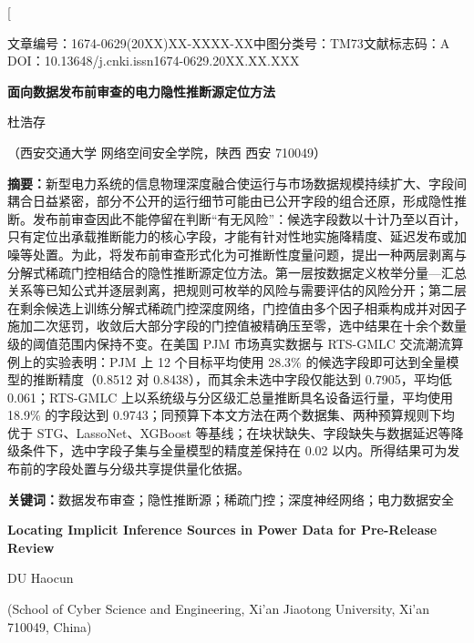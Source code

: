 \documentclass[UTF8,zihao=5,twoside]{ctexart}
\newcommand{\articleinfo}{文章编号：1674-0629(20XX)XX-XXXX-XX\quad 中图分类号：TM73\quad 文献标志码：A\\
DOI：10.13648/j.cnki.issn1674-0629.20XX.XX.XXX}
\begin{document}
\twocolumn[

\begin{center}
{\articleinfo}\par\vspace{1.0em}
{\sffamily{}\bfseries 面向数据发布前审查的电力隐性推断源定位方法}\par\vspace{0.8em}
{杜浩存}\par\vspace{0.4em}
{（西安交通大学 网络空间安全学院，陕西 西安 710049）}\par\vspace{0.8em}
\end{center}

\noindent\textbf{摘要：}新型电力系统的信息物理深度融合使运行与市场数据规模持续扩大、字段间耦合日益紧密，部分不公开的运行细节可能由已公开字段的组合还原，形成隐性推断。发布前审查因此不能停留在判断“有无风险”：候选字段数以十计乃至以百计，只有定位出承载推断能力的核心字段，才能有针对性地实施降精度、延迟发布或加噪等处置。为此，将发布前审查形式化为可推断性度量问题，提出一种两层剥离与分解式稀疏门控相结合的隐性推断源定位方法。第一层按数据定义枚举分量—汇总关系等已知公式并逐层剥离，把规则可枚举的风险与需要评估的风险分开；第二层在剩余候选上训练分解式稀疏门控深度网络，门控值由多个因子相乘构成并对因子施加二次惩罚，收敛后大部分字段的门控值被精确压至零，选中结果在十余个数量级的阈值范围内保持不变。在美国 PJM 市场真实数据与 RTS-GMLC 交流潮流算例上的实验表明：PJM 上 12 个目标平均使用 28.3\% 的候选字段即可达到全量模型的推断精度（0.8512 对 0.8438），而其余未选中字段仅能达到 0.7905，平均低 0.061；RTS-GMLC 上以系统级与分区级汇总量推断具名设备运行量，平均使用 18.9\% 的字段达到 0.9743；同预算下本文方法在两个数据集、两种预算规则下均优于 STG、LassoNet、XGBoost 等基线；在块状缺失、字段缺失与数据延迟等降级条件下，选中字段子集与全量模型的精度差保持在 0.02 以内。所得结果可为发布前的字段处置与分级共享提供量化依据。\par
\noindent\textbf{关键词：}数据发布审查；隐性推断源；稀疏门控；深度神经网络；电力数据安全\par\vspace{0.8em}

\begin{center}
{\bfseries\large Locating Implicit Inference Sources in Power Data for Pre-Release Review}\par\vspace{0.5em}
{DU Haocun}\par\vspace{0.3em}
{\small (School of Cyber Science and Engineering, Xi'an Jiaotong University, Xi'an 710049, China)}\par\vspace{0.5em}
\end{center}
\end{document}
